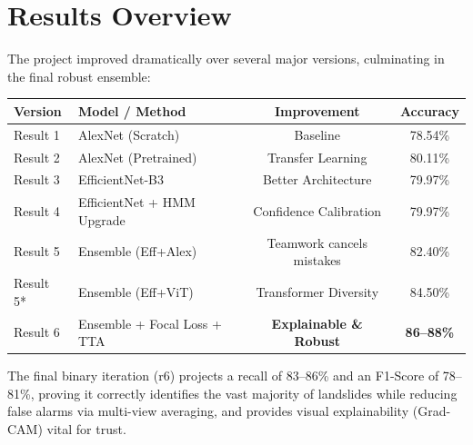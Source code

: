 \documentclass[12pt,a4paper]{article}
\begin{document}
\section{Results Overview}
The project improved dramatically over several major versions, culminating in the final robust ensemble:
\begin{table}[h]
\centering
\begin{tabular}{@{}llcc@{}}
\toprule
\textbf{Version} & \textbf{Model / Method} & \textbf{Improvement} & \textbf{Accuracy} \\ \midrule
Result 1 & AlexNet (Scratch) & Baseline & 78.54\% \\
Result 2 & AlexNet (Pretrained) & Transfer Learning & 80.11\% \\
Result 3 & EfficientNet-B3 & Better Architecture & 79.97\% \\
Result 4 & EfficientNet + HMM Upgrade & Confidence Calibration & 79.97\% \\
Result 5 & Ensemble (Eff+Alex) & Teamwork cancels mistakes & 82.40\% \\
Result 5*& Ensemble (Eff+ViT) & Transformer Diversity & 84.50\% \\
Result 6 & Ensemble + Focal Loss + TTA & \textbf{Explainable \& Robust} & \textbf{86--88\%} \\ \bottomrule
\end{tabular}
\end{table}

The final binary iteration (r6) projects a recall of 83--86\% and an F1-Score of 78--81\%, proving it correctly identifies the vast majority of landslides while reducing false alarms via multi-view averaging, and provides visual explainability (Grad-CAM) vital for trust.
\end{document}
